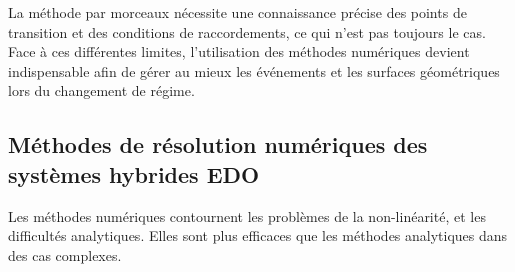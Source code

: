 \documentclass[12pt, oneside]{report} %
\theoremstyle{definition}
\theoremstyle{remark}
\begin{document}
	

La méthode par morceaux nécessite une connaissance précise des points de transition et des conditions de raccordements, ce qui n'est pas toujours le cas. Face à ces différentes limites, l'utilisation des méthodes numériques devient indispensable afin de gérer au mieux les événements et les surfaces géométriques lors du changement de régime. 
	
	\subsection{Méthodes de résolution numériques des systèmes hybrides EDO}
	 Les méthodes numériques contournent les problèmes de la non-linéarité, et les difficultés analytiques. Elles sont plus efficaces que les méthodes analytiques dans des cas complexes.
\end{document}
